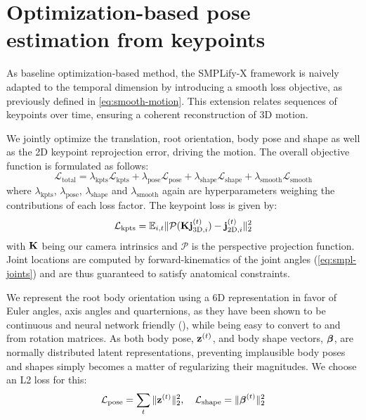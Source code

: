 \section{Optimization-based pose estimation from keypoints}
As baseline optimization-based method, the SMPLify-X framework is naively adapted to the temporal dimension by introducing a smooth loss objective, as previously defined in \cref{eq:smooth-motion}. This extension relates sequences of keypoints over time, ensuring a coherent reconstruction of 3D motion. 

We jointly optimize the translation, root orientation, body pose and shape as well as the 2D keypoint reprojection error, driving the motion. The overall objective function is formulated as follows:
\begin{equation}
    \mathcal{L}_{\text{total}} = \lambda_{\text{kpts}} \mathcal{L}_{\text{kpts}} + \lambda_{\text{pose}} \mathcal{L}_{\text{pose}} + \lambda_{\text{shape}} \mathcal{L}_{\text{shape}} + \lambda_{\text{smooth}} \mathcal{L}_{\text{smooth}}
\end{equation}
where $\lambda_\text{kpts}$,  $\lambda_\text{pose}$,  $\lambda_\text{shape}$ and  $\lambda_\text{smooth}$ again are hyperparameters weighing the contributions of each loss factor. The keypoint loss is given by:
\begin{equation} \label{eq:kpts-error}
    \mathcal{L}_\text{kpts} = \mathbb{E}_{i,t} \| \mathcal{P}( \boldsymbol{\mathbf{K}} \boldsymbol{\mathbf{j}}_{\text{3D},i}^{(t)}) - \boldsymbol{\mathbf{j}}_{\text{2D},i}^{(t)} \|_2^2
\end{equation}
with $\boldsymbol{\mathbf{K}}$ being our camera intrinsics and $\mathcal{P}$ is the perspective projection function. Joint locations are computed by forward-kinematics of the joint angles (\cref{eq:smpl-joints}) and are thus guaranteed to satisfy anatomical constraints. 

We represent the root body orientation using a 6D representation in favor of Euler angles, axis angles and quarternions, as they have been shown to be continuous and neural network friendly (\cite{Zhou_2019_CVPR}), while being easy to convert to and from rotation matrices. As both body pose, $\boldsymbol{\mathbf{z}}^{(t)}$, and body shape vectors, $\boldsymbol{\mathbf{\beta}}$, are normally distributed latent representations, preventing implausible body poses and shapes simply becomes a matter of regularizing their magnitudes. We choose an L2 loss for this:
\begin{equation}
    \mathcal{L}_\text{pose} = \sum_t \| \boldsymbol{\mathbf{z}}^{(t)} \|_2^2, \quad \mathcal{L}_\text{shape} =  \| \boldsymbol{\mathbf{\beta}}^{(t)} \|_2^2 
\end{equation}



